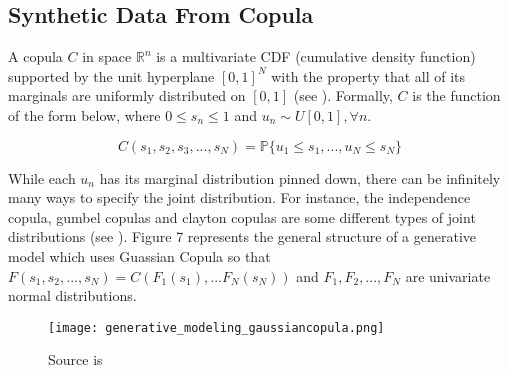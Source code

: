 \documentclass[12pt]{article}
\newcommand{\1}{\mathbbm 1}
\begin{document}
	
		
		
		
		
		
		
		\subsection{Synthetic Data From Copula}
		
		A copula $C$ in space $\mathbb{R}^{n}$ is a multivariate CDF (cumulative density function) supported by the unit hyperplane $[0,1]^{N}$ with the property that all of its marginals are uniformly distributed on $[0,1]$ (see \cite{stachurski2016primer}). Formally, $C$ is the function of the form below, where $0 \leq s_{n} \leq 1$ and $u_{n} \sim U[0, 1], \forall n$.
		
		\begin{equation}
			C(s_{1}, s_{2}, s_{3}, ... ,s_{N}) = \mathbb{P}\{u_{1} \leq s_{1}, ... , u_{N} \leq s_{N}\}
		\end{equation}
		
		While each $u_{n}$ has its marginal distribution pinned down, there can be infinitely many ways to specify the joint distribution. For instance, the independence copula, gumbel copulas and clayton copulas are some different types of joint distributions (see \cite{stachurski2016primer}). Figure 7 represents the general structure of a generative model which uses Guassian Copula so that $F(s_{1}, s_{2}, ..., s_{N}) = C(F_{1}(s_{1}), ... F_{N}(s_{N}))$ and $F_{1}, F_{2}, ... ,F_{N}$ are univariate normal distributions.
		
		
		
		
		
		
		
		
		
		
		
		
		
		
		
		
		
		\begin{figure}[H]
			\begin{Center}
				\texttt{[image: generative\_modeling\_gaussiancopula.png]}
				\caption{Source is  \cite{patki2016synthetic}}
			\end{Center}
		\end{figure}
		
\end{document}
